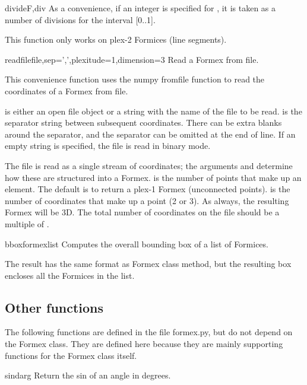 {{\begin{funcdesc}{divide}{F,div}
As a convenience, if an integer is specified for , it is taken as a
number of divisions for the interval [0..1].

This function only works on plex-2 Formices (line segments).
\end{funcdesc}


\begin{funcdesc}{readfile}{file,sep=',',plexitude=1,dimension=3}
Read a Formex from file.

This convenience function uses the numpy fromfile function to read the coordinates of a Formex from file. 

 is either an open file object or a string with the name of the file to be read.
 is the separator string between subsequent coordinates. There can be extra blanks around the separator, and the separator can be omitted at the end of line. If an empty string is specified, the file is read in binary mode.

The file is read as a single stream of coordinates; the arguments  and  determine how these are structured into a Formex.
 is the number of points that make up an element. The default is to return a plex-1 Formex (unconnected points).
 is the number of coordinates that make up a point (2 or 3). As always, the resulting Formex will be 3D.
The total number of coordinates on the file should be a multiple of .
\end{funcdesc}


\begin{funcdesc}{bbox}{formexlist}
Computes the overall bounding box of a list of Formices.

The result has the same format as Formex class  method, but the resulting box encloses all the Formices in the list.
\end{funcdesc}



\subsection{Other functions}
The following functions are defined in the file formex.py, but do not depend on the Formex class. They are defined here because they are mainly supporting functions for the Formex class itself.


\begin{funcdesc}{sind}{arg}
    Return the sin of an angle in degrees.
\end{funcdesc}

}}
